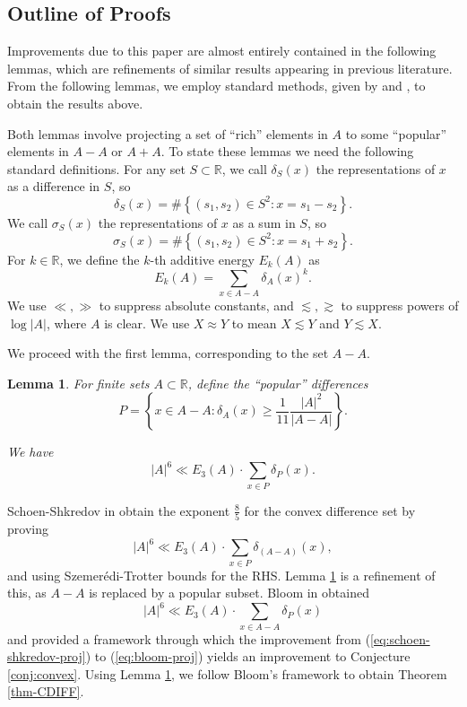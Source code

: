 \documentclass[reqno]{amsart}
\newcommand{\szemeredi}{Szemer{\'e}di}
\numberwithin{equation}{section}
\newtheorem{lemma}[theorem]{Lemma}
\begin{document}
\bigskip

\subsection*{Outline of Proofs}

Improvements due to this paper are almost entirely contained in the following lemmas, which
are refinements of similar results appearing in previous literature. From the following lemmas,
we employ standard methods, given by \cite{rudnev-stevens} and \cite{bloom}, to obtain 
the results above.

Both lemmas involve projecting a set of ``rich'' elements in \(A\) to some ``popular''
elements in \(A-A\) or \(A+A\).
To state these lemmas we need the following standard definitions.
For any set \(S \subset \mathbb{R} \),
we call \(\delta_{S}(x) \) the representations of \(x\) as a difference
in \(S\), so
\[
    \delta_{S} (x) = \# \left\{ (s_1,s_2)\in S^{2} : x = s_1 - s_2 \right\} 
.\]
We call \(\sigma_{S} (x)\) the representations of \(x\) as a sum in \(S\), so 
\[
    \sigma_{S} (x) = \# \left\{ (s_1,s_2)\in S^{2} : x = s_1 + s_2 \right\} 
.\]
For \(k \in \mathbb{R} \), we define the \(k\)-th additive energy \(E_k(A)\) as
\[
    E_{k} (A) = \sum _{x \in A-A} \delta_{A} (x)^{k} 
.\]
We use \(\ll, \gg\) to suppress absolute constants, and \(\lesssim, \gtrsim \) to suppress
powers of \(\log \left\lvert A \right\rvert \), where \(A\) is clear. We use
\(X \approx Y\) to mean \(X \lesssim Y\) and \(Y \lesssim X\).

We proceed with the first lemma, corresponding to the set \(A-A\).
\begin{lemma}\label{lem:diff-proj}
For finite sets \(A \subset \mathbb{R} \), define the ``popular'' differences
\[
P =\left\{x \in A-A: \delta_A(x) \geq \frac{1}{11} \frac{|A|^2}{|A-A|}\right\}
.\]

We have
\begin{equation} \label{eq:diff-proj-eq}
    \left\lvert A \right\rvert ^{6} \ll E_3(A)\cdot \sum _{x \in P} \delta_{P}(x).
\end{equation}
\end{lemma}

Schoen-Shkredov in \cite{schoen-shkredov} obtain the exponent \(\frac{8}{5}\) for the convex difference set by proving
\begin{equation} \label{eq:schoen-shkredov-proj}
    \left\lvert A \right\rvert ^{6} \ll E_3(A) \cdot \sum _{x \in P} \delta_{(A-A)} (x),
\end{equation}
and using \szemeredi-Trotter bounds for the RHS. Lemma \ref{lem:diff-proj} is a
refinement of this, as \(A-A\) is replaced by a popular subset. Bloom in \cite{bloom}
obtained
\begin{equation} \label{eq:bloom-proj}
    \left\lvert A \right\rvert ^{6} \ll E_3(A) \cdot \sum _{x \in A-A} \delta _{P} (x)
\end{equation}
and provided a framework through which the improvement from (\ref{eq:schoen-shkredov-proj}) to
(\ref{eq:bloom-proj}) yields an improvement to Conjecture \ref{conj:convex}.
Using Lemma \ref{lem:diff-proj}, we follow Bloom's framework to obtain
Theorem \ref{thm-CDIFF}.
\end{document}
